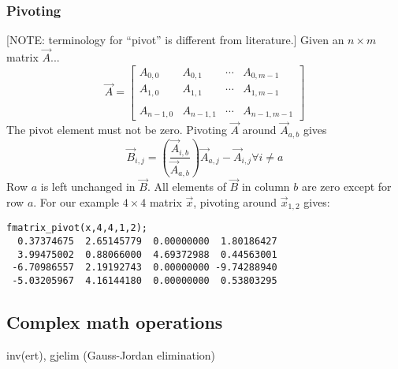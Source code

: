 \subsubsection{Pivoting}
[NOTE: terminology for ``pivot'' is different from literature.]
Given an $n \times m$ matrix $\vec{A}$...
\[
    \vec{A} = 
    \begin{bmatrix}
        A_{0,0}     & A_{0,1}   & \cdots  & A_{0,m-1} \\
        A_{1,0}     & A_{1,1}   & \cdots  & A_{1,m-1} \\
        \\
        A_{n-1,0}   & A_{n-1,1} & \cdots  & A_{n-1,m-1}
    \end{bmatrix}
\]
The pivot element must not be zero.
Pivoting $\vec{A}$ around $\vec{A}_{a,b}$ gives
\[
    \vec{B}_{i,j} = \left(
                    \frac{\vec{A}_{i,b}}{\vec{A}_{a,b}}
                    \right)
                    \vec{A}_{a,j} - \vec{A}_{i,j}
                    \forall i \ne a
\]
Row $a$ is left unchanged in $\vec{B}$.
All elements of $\vec{B}$ in column $b$ are zero except for row $a$.
For our example $4 \times 4$ matrix $\vec{x}$, pivoting around
$\vec{x}_{1,2}$ gives:
\begin{verbatim}
fmatrix_pivot(x,4,4,1,2);
  0.37374675  2.65145779  0.00000000  1.80186427
  3.99475002  0.88066000  4.69372988  0.44563001
 -6.70986557  2.19192743  0.00000000 -9.74288940
 -5.03205967  4.16144180  0.00000000  0.53803295
\end{verbatim}

\subsection{Complex math operations}
\label{module:matrix:complex}
inv(ert), gjelim (Gauss-Jordan elimination)

